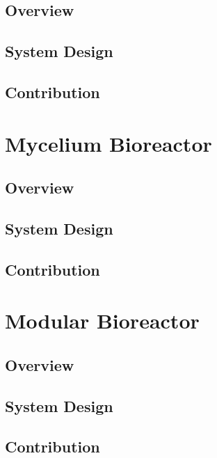 \subsection{Overview}
\subsection{System Design}
\subsection{Contribution}


\section{Mycelium Bioreactor}

\subsection{Overview}
\subsection{System Design}
\subsection{Contribution}

\section{Modular Bioreactor}

\subsection{Overview}
\subsection{System Design}
\subsection{Contribution}


